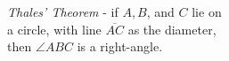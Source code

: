 \documentclass[preview]{standalone}
\begin{document}
\begin{center}
\textit{Thales' Theorem} - if $A,B$, and $C$ lie on \\a circle, with line $\overline{AC}$ as the diameter,\\ then $\angle ABC$ is a right-angle.
\end{center}
\end{document}
